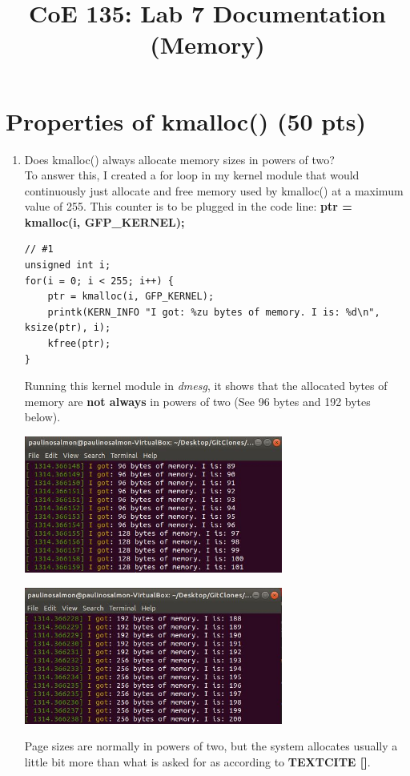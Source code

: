 \documentclass[conference]{IEEEtran}
\newcommand\tab[1][0.5cm]{\hspace*{#1}}
\begin{document}
\title{CoE 135: Lab 7 Documentation (Memory)\\
}

\author{
	}		
\maketitle

\section{Properties of kmalloc() (50 pts)}
\begin{enumerate}
\item Does kmalloc() always allocate memory sizes in powers of two? \\
\tab To answer this, I created a for loop in my kernel module that would continuously just allocate and free memory used by kmalloc() at a maximum value of 255. This counter is to be plugged in the code line: \textbf{ptr = kmalloc(i, GFP\_KERNEL);}
\begin{lstlisting}
// #1
unsigned int i;
for(i = 0; i < 255; i++) {
	ptr = kmalloc(i, GFP_KERNEL);
	printk(KERN_INFO "I got: %zu bytes of memory. I is: %d\n", ksize(ptr), i);
	kfree(ptr);
}
\end{lstlisting}
\tab Running this kernel module in \textit{dmesg}, it shows that the allocated bytes of memory are \textbf{not always} in powers of two (See 96 bytes and 192 bytes below).
\begin{center}
	\includegraphics[width=8.5cm, height=4.5cm]{memory1.jpg}
\end{center}
\begin{center}
	\includegraphics[width=8.5cm, height=4.5cm]{memory2.jpg}
\end{center}
\tab Page sizes are normally in powers of two, but the system allocates usually a little bit more than what is asked for as according to \textbf{TEXTCITE []}. \\


\end{enumerate}
\end{document}
